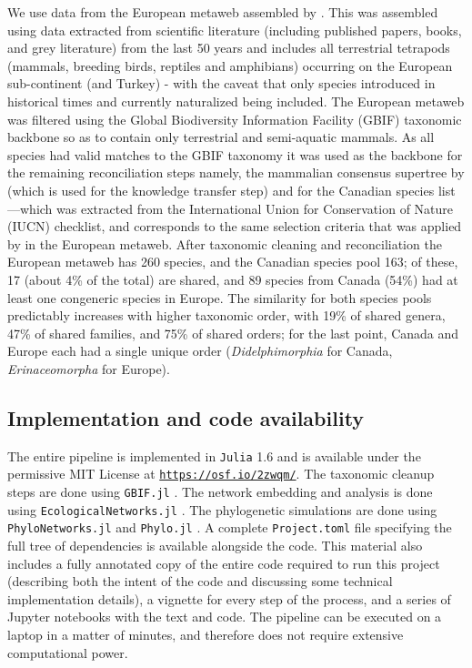 We use data from the European metaweb assembled by \cite{Maiorano2020TetSpe}.
This was assembled using data extracted from scientific literature
(including published papers, books, and grey literature) from the last
50 years and includes all terrestrial tetrapods (mammals, breeding
birds, reptiles and amphibians) occurring on the European sub-continent
(and Turkey) - with the caveat that only species introduced in
historical times and currently naturalized being included. The European
metaweb was filtered using the Global Biodiversity Information Facility
(GBIF) taxonomic backbone \cite{GBIFSecretariat2021GbiBac} so as to
contain only terrestrial and semi-aquatic mammals. As all species had
valid matches to the GBIF taxonomy it was used as the backbone for the
remaining reconciliation steps namely, the mammalian consensus supertree
by \cite{Upham2019InfMam} (which is used for the knowledge transfer step) and
for the Canadian species list---which was extracted from the
International Union for Conservation of Nature (IUCN) checklist, and
corresponds to the same selection criteria that was applied by
\cite{Maiorano2020TetSpe} in the European metaweb. After taxonomic cleaning
and reconciliation the European metaweb has 260 species, and the
Canadian species pool 163; of these, 17 (about 4\% of the total) are
shared, and 89 species from Canada (54\%) had at least one congeneric
species in Europe. The similarity for both species pools predictably
increases with higher taxonomic order, with 19\% of shared genera, 47\%
of shared families, and 75\% of shared orders; for the last point,
Canada and Europe each had a single unique order (\emph{Didelphimorphia}
for Canada, \emph{Erinaceomorpha} for Europe).

\subsection{Implementation and code
availability}\label{implementation-and-code-availability}

The entire pipeline is implemented in \texttt{Julia} 1.6
\cite{Bezanson2017JulFre} and is available under the permissive MIT
License at \href{https://osf.io/2zwqm/}{\texttt{https://osf.io/2zwqm/}}.
The taxonomic cleanup steps are done using \texttt{GBIF.jl}
\cite{Dansereau2021SimJl}. The network embedding and analysis is done
using \texttt{EcologicalNetworks.jl} \cite{Banville2021ManJl,
Poisot2019EcoJl}. The phylogenetic simulations are done using
\texttt{PhyloNetworks.jl} \cite{Solis-Lemus2017PhyPac} and
\texttt{Phylo.jl} \cite{Reeve2016HowPar}. A complete
\texttt{Project.toml} file specifying the full tree of dependencies is
available alongside the code. This material also includes a fully
annotated copy of the entire code required to run this project
(describing both the intent of the code and discussing some technical
implementation details), a vignette for every step of the process, and a
series of Jupyter notebooks with the text and code. The pipeline can be
executed on a laptop in a matter of minutes, and therefore does not
require extensive computational power.

